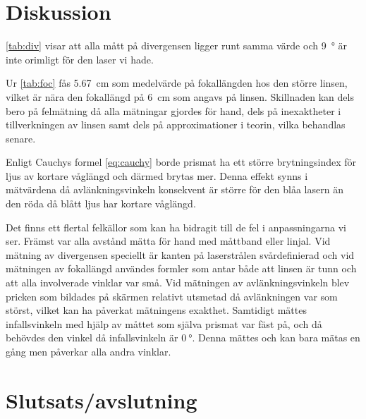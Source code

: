 \documentclass[a4paper]{article}
\begin{document}
\FloatBarrier

\section{Diskussion}
  
\autoref{tab:div} visar att alla mått på divergensen ligger runt samma värde och \SI{9}{\degree} är inte orimligt för den laser vi hade.

Ur \autoref{tab:foc} fås \SI{5.67}{\centi\meter} som medelvärde på fokallängden hos den större linsen, vilket är nära den fokallängd på \SI{6}{\centi\meter} som angavs på linsen. Skillnaden kan dels bero på felmätning då alla mätningar gjordes för hand, dels på inexaktheter i tillverkningen av linsen samt dels på approximationer i teorin, vilka behandlas senare.
  
  
  Enligt Cauchys formel \eqref{eq:cauchy} borde prismat ha ett större brytningsindex för ljus av kortare våglängd och därmed brytas mer. Denna effekt synns i mätvärdena då avlänkningsvinkeln konsekvent är större för den blåa lasern än den röda då blått ljus har kortare våglängd.
  
  
  

  Det finns ett flertal felkällor som kan ha bidragit till de fel i anpassningarna vi ser. Främst var alla avstånd mätta för hand med måttband eller linjal. Vid mätning av divergensen speciellt är kanten på laserstrålen svårdefinierad och vid mätningen av fokallängd användes formler som antar både att linsen är tunn och att alla involverade vinklar var små. Vid mätningen av avlänkningsvinkeln blev pricken som bildades på skärmen relativt utsmetad då avlänkningen var som störst, vilket kan ha påverkat mätningens exakthet. Samtidigt mättes infallsvinkeln med hjälp av måttet som själva prismat var fäst på, och då behövdes den vinkel då infallsvinkeln är $\SI{0}{\degree}$. Denna mättes och kan bara mätas en gång men påverkar alla andra vinklar.
  

\section{Slutsats/avslutning}
\end{document}
